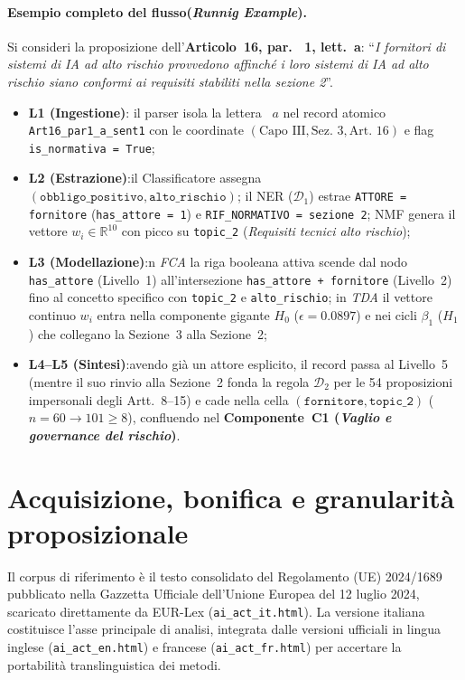 \documentclass[12pt,a4paper,oneside]{report}
\begin{document}
\paragraph{Esempio completo del flusso(\emph{Runnig Example}).}
Si consideri la proposizione dell'\textbf{Articolo~16, par. ~1, lett.~a}: \enquote{\emph{I fornitori di sistemi di IA ad alto rischio provvedono affinché i loro sistemi di IA ad alto rischio siano conformi ai requisiti stabiliti nella sezione 2}}.
\begin{itemize}
    \item \textbf{L1 (Ingestione)}: il parser isola la lettera ~$a$ nel record atomico \texttt{Art16\_par1\_a\_sent1} con le coordinate $(\text{Capo~III}, \text{Sez.~3}, \text{Art.~16})$ e flag \texttt{is\_normativa = True};
    \item \textbf{L2 (Estrazione)}:il Classificatore assegna $(\texttt{obbligo\_positivo}, \texttt{alto\_rischio})$; il NER ($\mathcal{D}_1$) estrae \texttt{ATTORE = fornitore} (\texttt{has\_attore = 1}) e \texttt{RIF\_NORMATIVO = sezione 2}; NMF genera il vettore $w_i \in \mathbb{R}^{10}$ con picco su \texttt{topic\_2} (\emph{Requisiti tecnici alto rischio});
    \item \textbf{L3 (Modellazione)}:n \emph{FCA} la riga booleana attiva scende dal nodo \texttt{has\_attore} (Livello~1) all'intersezione \texttt{has\_attore + fornitore} (Livello~2) fino al concetto specifico con \texttt{topic\_2} e \texttt{alto\_rischio}; in \emph{TDA} il vettore continuo $w_i$ entra nella componente gigante $H_0$ ($\epsilon = \num{0,0897}$) e nei cicli $\beta_1$ ($H_1$) che collegano la Sezione~3 alla Sezione~2;
    \item \textbf{L4--L5 (Sintesi)}:avendo già un attore esplicito, il record passa al Livello~5 (mentre il suo rinvio alla Sezione~2 fonda la regola $\mathcal{D}_2$ per le 54 proposizioni impersonali degli Artt.~8--15) e cade nella cella $(\texttt{fornitore}, \texttt{topic\_2})$ ($n = 60 \to 101 \ge 8$), confluendo nel \textbf{Componente~C1 (\emph{Vaglio e governance del rischio})}.
\end{itemize}

\section{Acquisizione, bonifica e granularità proposizionale}
\label{sec:acquisizione_bonifica}

Il corpus di riferimento è il testo consolidato del Regolamento (UE) 2024/1689 pubblicato nella Gazzetta Ufficiale dell'Unione Europea del 12 luglio 2024, scaricato direttamente da EUR-Lex (\texttt{ai\_act\_it.html}). La versione italiana costituisce l'asse principale di analisi, integrata dalle versioni ufficiali in lingua inglese (\texttt{ai\_act\_en.html}) e francese (\texttt{ai\_act\_fr.html}) per accertare la portabilità translinguistica dei metodi.
\end{document}
